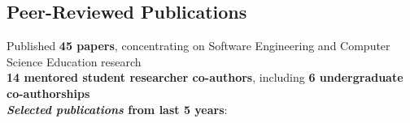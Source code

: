 \documentclass[10pt,letterpaper]{article}
\begin{document}
\subsection*{Peer-Reviewed Publications}
Published \textbf{45 papers}, concentrating on Software Engineering and Computer Science Education research \\
\textbf{14 mentored student researcher co-authors}, including \textbf{6 undergraduate co-authorships} \\
\textbf{\textit{Selected publications} from last 5 years}:
\begin{refsection}
\nocite{
hundhousen2026,
srivastava2026,
buffardi2026studentreflections,
more2026pareto,
bijoor2025gitdash,
wang2025expanding,
buffardi2025consistency,
buffardi2024designing,
buffardi2023cognitive,
buffardi2023codevid,
buffardi2022integrating,
buffardi2022codewitus,
morrison2022evidence,
buffardi2021relevant,
alavi2021redesigning,
buffardi2021unittestsmells,
}
\printbibliography[heading=none]
\end{refsection}
\end{document}
